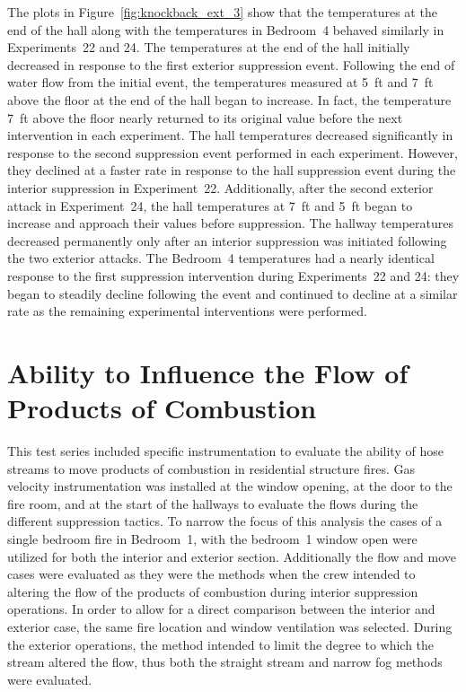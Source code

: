 \documentclass[12pt,oneside]{book}
\begin{document}
\FloatBarrier 

The plots in Figure~\ref{fig:knockback_ext_3} show that the temperatures at the end of the hall along with the temperatures in Bedroom~4 behaved similarly in Experiments~22 and 24. The temperatures at the end of the hall initially decreased in response to the first exterior suppression event. Following the end of water flow from the initial event, the temperatures measured at 5~ft and 7~ft above the floor at the end of the hall began to increase. In fact, the temperature 7~ft above the floor nearly returned to its original value before the next intervention in each experiment. The hall temperatures decreased significantly in response to the second suppression event performed in each experiment. However, they declined at a faster rate in response to the hall suppression event during the interior suppression in Experiment~22. Additionally, after the second exterior attack in Experiment~24, the hall temperatures at 7~ft and 5~ft began to increase and approach their values before suppression. The hallway temperatures decreased permanently only after an interior suppression was initiated following the two exterior attacks. The Bedroom~4 temperatures had a nearly identical response to the first suppression intervention during Experiments~22 and 24: they began to steadily decline following the event and continued to decline at a similar rate as the remaining experimental interventions were performed. 

\FloatBarrier

\section{Ability to Influence the Flow of Products of Combustion}
This test series included specific instrumentation to evaluate the ability of hose streams to move products of combustion in residential structure fires. Gas velocity instrumentation was installed at the window opening, at the door to the fire room, and at the start of the hallways to evaluate the flows during the different suppression tactics. To narrow the focus of this analysis the cases of a single bedroom fire in Bedroom~1, with the bedroom~1 window open were utilized for both the interior and exterior section. Additionally the flow and move cases were evaluated as they were the methods when the crew intended to altering the flow of the products of combustion during interior suppression operations. In order to allow for a direct comparison between the interior and exterior case, the same fire location and window ventilation was selected. During the exterior operations, the method intended to limit the degree to which the stream altered the flow, thus both the straight stream and narrow fog methods were evaluated.  
\end{document}

